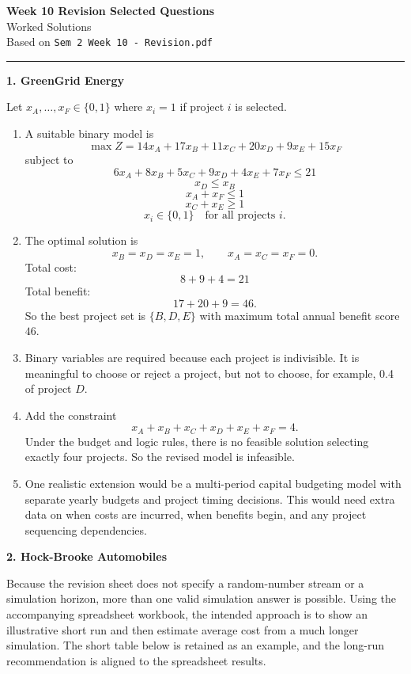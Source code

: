 \documentclass[11pt,a4paper]{article}
\begin{document}
\begin{center}
{\Large\bfseries\color{packblue} Week 10 Revision Selected Questions}\\[0.4em]
{\large Worked Solutions}\\[0.3em]
{\color{packgrey} Based on \texttt{Sem 2 Week 10 - Revision.pdf}}
\end{center}

\vspace{0.8em}
\hrule
\vspace{1em}

\textbf{1. GreenGrid Energy}

Let $x_A,\ldots,x_F \in \{0,1\}$ where $x_i=1$ if project $i$ is selected.

\begin{enumerate}
\item A suitable binary model is
\[
\max Z = 14x_A+17x_B+11x_C+20x_D+9x_E+15x_F
\]
subject to
\[
6x_A+8x_B+5x_C+9x_D+4x_E+7x_F \le 21
\]
\[
x_D \le x_B
\]
\[
x_A+x_F \le 1
\]
\[
x_C+x_E \ge 1
\]
\[
x_i \in \{0,1\} \quad \text{for all projects } i.
\]

\item The optimal solution is
\[
x_B=x_D=x_E=1,\qquad x_A=x_C=x_F=0.
\]
Total cost:
\[
8+9+4=21
\]
Total benefit:
\[
17+20+9=46.
\]
So the best project set is $\{B,D,E\}$ with maximum total annual benefit score $46$.

\item Binary variables are required because each project is indivisible.
It is meaningful to choose or reject a project, but not to choose, for example, 0.4 of project $D$.

\item Add the constraint
\[
x_A+x_B+x_C+x_D+x_E+x_F=4.
\]
Under the budget and logic rules, there is no feasible solution selecting exactly four projects.
So the revised model is infeasible.

\item One realistic extension would be a multi-period capital budgeting model with separate yearly budgets and project timing decisions.
This would need extra data on when costs are incurred, when benefits begin, and any project sequencing dependencies.
\end{enumerate}

\newpage

\textbf{2. Hock-Brooke Automobiles}

Because the revision sheet does not specify a random-number stream or a simulation horizon, more than one valid simulation answer is possible.
Using the accompanying spreadsheet workbook, the intended approach is to show an illustrative short run and then estimate average cost from a much longer simulation.
The short table below is retained as an example, and the long-run recommendation is aligned to the spreadsheet results.
\end{document}
